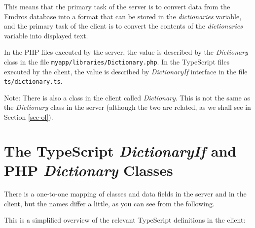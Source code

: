 \documentclass[11pt,oneside,a4paper]{memoir}
\begin{document}
This means that the primary task of the server is to convert data from the Emdros
database into a format that can be stored in the \emph{dictionaries} variable, and the primary task
of the client is to convert the contents of the \emph{dictionaries} variable into
displayed text.

In the PHP files executed by the server, the value is described by the \emph{Dictionary}%
class in the file \texttt{myapp/libraries/Dictionary.php}. In the TypeScript files executed by the
client, the value is described by \emph{DictionaryIf}%
interface in the file \texttt{ts/dictionary.ts}.

Note: There is also a class in the client called \emph{Dictionary}. This is not the same as the
\emph{Dictionary} class in the server (although the two are related, as we shall see in Section
\ref{sec-ol}).


\section{The TypeScript \emph{DictionaryIf} and PHP \emph{Dictionary} Classes}\label{sec-dictionaryif}%
%

There is a one-to-one mapping of classes and data fields in the server and in the client, but the
names differ a little, as you can see from the following.

This is a simplified overview of the relevant TypeScript definitions in the client:
\end{document}
